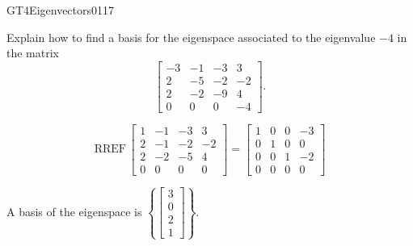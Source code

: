 \begin{exercise}{GT4}{Eigenvectors}{0117} 
\begin{exerciseStatement} 

Explain how to find a basis for the eigenspace associated to the eigenvalue \(-4\) in the matrix \[\left[\begin{array}{cccc}
-3 & -1 & -3 & 3 \\
2 & -5 & -2 & -2 \\
2 & -2 & -9 & 4 \\
0 & 0 & 0 & -4
\end{array}\right].\]

 \end{exerciseStatement}
 \begin{exerciseAnswer} 

\[\mathrm{RREF}\,\left[\begin{array}{cccc}
1 & -1 & -3 & 3 \\
2 & -1 & -2 & -2 \\
2 & -2 & -5 & 4 \\
0 & 0 & 0 & 0
\end{array}\right]=\left[\begin{array}{cccc}
1 & 0 & 0 & -3 \\
0 & 1 & 0 & 0 \\
0 & 0 & 1 & -2 \\
0 & 0 & 0 & 0
\end{array}\right]\]

 

A basis of the eigenspace is \(\left\{ \left[\begin{array}{c}
3 \\
0 \\
2 \\
1
\end{array}\right] \right\}\).

 \end{exerciseAnswer}
 \end{exercise}


\newpage




